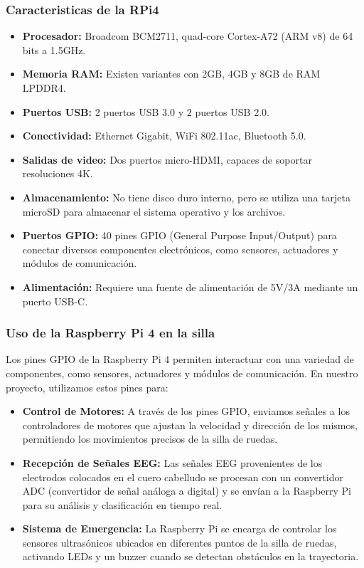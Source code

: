 \documentclass{article}
\begin{document}
\subsubsection{Caracteristicas de la RPi4}
\begin{itemize}
    \item \textbf{Procesador:} Broadcom BCM2711, quad-core Cortex-A72 (ARM v8) de 64 bits a 1.5GHz.
    \item \textbf{Memoria RAM:} Existen variantes con 2GB, 4GB y 8GB de RAM LPDDR4.
    \item \textbf{Puertos USB:} 2 puertos USB 3.0 y 2 puertos USB 2.0.
    \item \textbf{Conectividad:} Ethernet Gigabit, WiFi 802.11ac, Bluetooth 5.0.
    \item \textbf{Salidas de video:} Dos puertos micro-HDMI, capaces de soportar resoluciones 4K.
    \item \textbf{Almacenamiento:} No tiene disco duro interno, pero se utiliza una tarjeta microSD para almacenar el sistema operativo y los archivos.
    \item \textbf{Puertos GPIO:} 40 pines GPIO (General Purpose Input/Output) para conectar diversos componentes electrónicos, como sensores, actuadores y módulos de comunicación.
    \item \textbf{Alimentación:} Requiere una fuente de alimentación de 5V/3A mediante un puerto USB-C.
\end{itemize}

\subsubsection{Uso de la Raspberry Pi 4 en la silla}
Los pines GPIO de la Raspberry Pi 4 permiten interactuar con una variedad de componentes, como sensores, actuadores y módulos de comunicación. En nuestro proyecto, utilizamos estos pines para:

\begin{itemize}
    \item \textbf{Control de Motores:} A través de los pines GPIO, enviamos señales a los controladores de motores que ajustan la velocidad y dirección de los mismos, permitiendo los movimientos precisos de la silla de ruedas.
    \item \textbf{Recepción de Señales EEG:} Las señales EEG provenientes de los electrodos colocados en el cuero cabelludo se procesan con un convertidor ADC (convertidor de señal análoga a digital) y se envían a la Raspberry Pi para su análisis y clasificación en tiempo real.
    \item \textbf{Sistema de Emergencia:} La Raspberry Pi se encarga de controlar los sensores ultrasónicos ubicados en diferentes puntos de la silla de ruedas, activando LEDs y un buzzer cuando se detectan obstáculos en la trayectoria.
\end{itemize}
\end{document}
